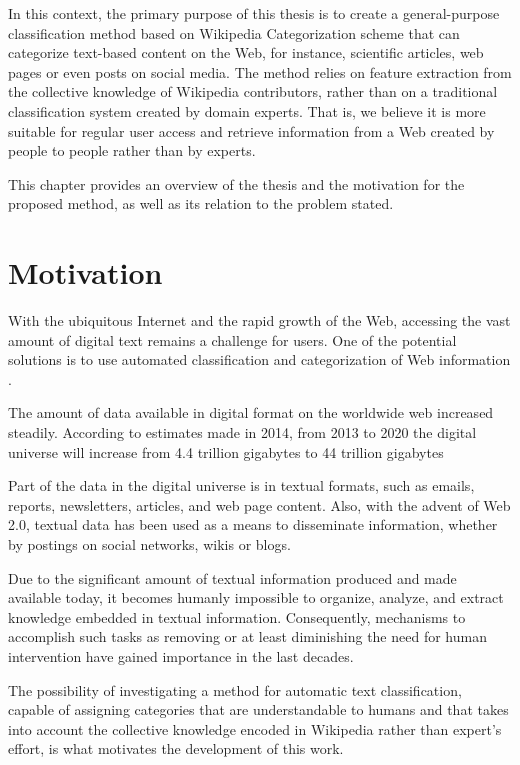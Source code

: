 In this context, the primary purpose of this thesis is to create a general-purpose classification method based on Wikipedia Categorization scheme that can categorize text-based content on the Web, for instance, scientific articles, web pages or even posts on social media. The method relies on feature extraction from the collective knowledge of Wikipedia contributors, rather than on a traditional classification system created by domain experts. That is, we believe it is more suitable for regular user access and retrieve information from a Web created by people to people rather than by experts.

This chapter provides an overview of the thesis and the motivation for the proposed method, as well as its relation to the problem stated. 

\section{\hspace*{3pt}Motivation}

With the ubiquitous Internet and the rapid growth of the Web, accessing the vast amount of digital text remains a challenge for users. One of the potential solutions is to use automated classification and categorization of Web information \cite{Gabrilovich:2005}.

The amount of data available in digital format on the worldwide web increased steadily. According to estimates made in 2014, from 2013 to 2020 the digital universe will increase from 4.4 trillion gigabytes to 44 trillion gigabytes ~\cite{turner2014digital}

Part of the data in the digital universe is in textual formats, such as emails, reports, newsletters, articles, and web page content. Also, with the advent of Web 2.0, textual data has been used as a means to disseminate information, whether by postings on social networks, wikis or blogs. ~\cite{fuchs2013internet} ~\cite{o2009web}

Due to the significant amount of textual information produced and made available today, it becomes humanly impossible to organize, analyze, and extract knowledge embedded in textual information. Consequently, mechanisms to accomplish such tasks as removing or at least diminishing the need for human intervention have gained importance in the last decades. ~\cite{feldman2007text} ~\cite{berry2010text} ~\cite{aggarwal2012mining} 

The possibility of investigating a method for automatic text classification, capable of assigning categories that are understandable to humans and that takes into account the collective knowledge encoded in Wikipedia rather than expert's effort, is what motivates the development of this work.


